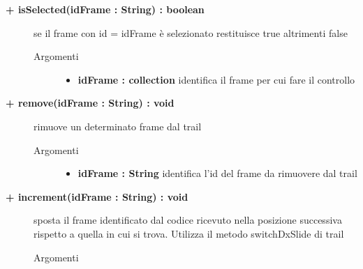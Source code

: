 \begin{description}
	\begin{description}
		\item[\textbf{\color{blue}+ isSelected(idFrame : String) : boolean			}] \hfill
			se il frame con id = idFrame è selezionato restituisce true altrimenti false
			
		\begin{description}
			\item[Argomenti] \hfill
				\begin{itemize}
				
					\item \textbf{idFrame : collection			} \hfill
						identifica il frame per cui fare il controllo
					
				\end{itemize}
		\end{description}
	\end{description}
	
	\begin{description}
		\item[\textbf{\color{blue}+ remove(idFrame : String) : void			}] \hfill
			rimuove un determinato frame dal trail
			
		\begin{description}
			\item[Argomenti] \hfill
				\begin{itemize}
				
					\item \textbf{idFrame : String			} \hfill
						identifica l'id del frame da rimuovere dal trail
					
				\end{itemize}
		\end{description}
	\end{description}
	
	\begin{description}
		\item[\textbf{\color{blue}+ increment(idFrame : String) : void			}] \hfill
			sposta il frame identificato dal codice ricevuto nella posizione successiva rispetto a quella in cui si trova. Utilizza il metodo switchDxSlide di trail
			
		\begin{description}
			\item[Argomenti] \hfill
				\begin{itemize}
				

\end{itemize}
\end{description}
\end{description}
\end{description}
